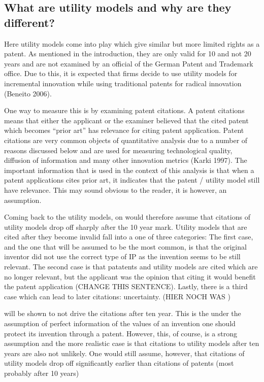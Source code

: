 \documentclass[
  12pt,
]{article}
\begin{document}
\hypertarget{what-are-utility-models-and-why-are-they-different}{%
\subsection{What are utility models and why are they
different?}\label{what-are-utility-models-and-why-are-they-different}}

Here utility models come into play which give similar but more limited
rights as a patent. As mentioned in the introduction, they are only
valid for 10 and not 20 years and are not examined by an official of the
German Patent and Trademark office. Due to this, it is expected that
firms decide to use utility models for incremental innovation while
using traditional patents for radical innovation (Beneito 2006).

One way to measure this is by examining patent citations. A patent
citations means that either the applicant or the examiner believed that
the cited patent which becomes ``prior art'' has relevance for citing
patent application. Patent citations are very common objects of
quantitative analysis due to a number of reasons discussed below and are
used for measuring technological quality, diffusion of information and
many other innovation metrics (Karki 1997). The important information
that is used in the context of this analysis is that when a patent
applications cites prior art, it indicates that the patent / utility
model still have relevance. This may sound obvious to the reader, it is
however, an assumption.

Coming back to the utility models, on would therefore assume that
citations of utility models drop off sharply after the 10 year mark.
Utility models that are cited after they become invalid fall into a one
of three categories: The first case, and the one that will be assumed to
be the most common, is that the original inventor did not use the
correct type of IP as the invention seems to be still relevant. The
second case is that patatents and utility models are cited which are no
longer relevant, but the applicant was the opinion that citing it would
benefit the patent application (CHANGE THIS SENTENCE). Lastly, there is
a third case which can lead to later citations: uncertainty. (HIER NOCH
WAS )

will be shown to not drive the citations after ten year. This is the
under the assumption of perfect information of the values of an
invention one should protect its invention through a patent. However,
this, of course, is a strong assumption and the more realistic case is
that citations to utility models after ten years are also not unlikely.
One would still assume, however, that citations of utility models drop
off significantly earlier than citations of patents (most probably after
10 years)
\end{document}
